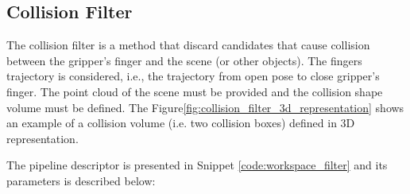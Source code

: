 \subsection{Collision Filter}
\label{cap4:modular_grasping_architecture:sec:grasp_selection:subsec:collision_filter}

The collision filter is a method that discard candidates that cause collision between the gripper's finger and the scene (or other objects). The fingers trajectory is considered, i.e., the trajectory from open pose to close gripper's finger. The point cloud of the scene must be provided and the collision shape volume must be defined. The Figure\ref{fig:collision_filter_3d_representation} shows an example of a collision volume (i.e. two collision boxes) defined in 3D representation.


\begin{figure}[h!] %
\end{figure}

The pipeline descriptor is presented in Snippet \ref{code:workspace_filter} and its parameters is described below:

